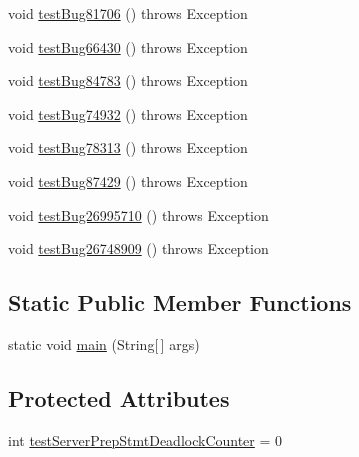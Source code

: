 \begin{DoxyCompactItemize}
void \mbox{\hyperlink{classtestsuite_1_1regression_1_1_statement_regression_test_aa0b8a4caabb1d1ebc0338bcffacce81d}{test\+Bug81706}} ()  throws Exception 
\item 
void \mbox{\hyperlink{classtestsuite_1_1regression_1_1_statement_regression_test_ae6be3545c08d7afbbad86397d2ef9fb0}{test\+Bug66430}} ()  throws Exception 
\item 
void \mbox{\hyperlink{classtestsuite_1_1regression_1_1_statement_regression_test_a6a4bd5b7999d75792d30bdeb1b17b5af}{test\+Bug84783}} ()  throws Exception 
\item 
void \mbox{\hyperlink{classtestsuite_1_1regression_1_1_statement_regression_test_a08b73e136a8dc102c6b24d67e1eb88ea}{test\+Bug74932}} ()  throws Exception 
\item 
void \mbox{\hyperlink{classtestsuite_1_1regression_1_1_statement_regression_test_adfebb14cf4625719dc11d7397ae26d6f}{test\+Bug78313}} ()  throws Exception 
\item 
void \mbox{\hyperlink{classtestsuite_1_1regression_1_1_statement_regression_test_aa6905a68082eddc9934046c2d8c15bae}{test\+Bug87429}} ()  throws Exception 
\item 
void \mbox{\hyperlink{classtestsuite_1_1regression_1_1_statement_regression_test_aed1e01598c9eb8bf849b56e0646f302c}{test\+Bug26995710}} ()  throws Exception 
\item 
void \mbox{\hyperlink{classtestsuite_1_1regression_1_1_statement_regression_test_a5008a06c6bd62560f9ffcbbc16be7495}{test\+Bug26748909}} ()  throws Exception 
\end{DoxyCompactItemize}
\subsection*{Static Public Member Functions}
\begin{DoxyCompactItemize}
\item 
static void \mbox{\hyperlink{classtestsuite_1_1regression_1_1_statement_regression_test_a47cd85214f68ea331f0b16fcc90771a9}{main}} (String\mbox{[}$\,$\mbox{]} args)
\end{DoxyCompactItemize}
\subsection*{Protected Attributes}
\begin{DoxyCompactItemize}
\item 
int \mbox{\hyperlink{classtestsuite_1_1regression_1_1_statement_regression_test_abc0a2681fb2194305be7870e5e1dc1eb}{test\+Server\+Prep\+Stmt\+Deadlock\+Counter}} = 0
\end{DoxyCompactItemize}
